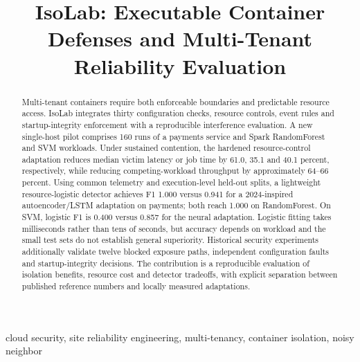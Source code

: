 \documentclass[conference,letterpaper]{IEEEtran}
\begin{document}
\title{IsoLab: Executable Container Defenses and Multi-Tenant Reliability Evaluation}
\author{
\and
{}
}
\maketitle

\begin{abstract}
Multi-tenant containers require both enforceable boundaries and predictable resource access. IsoLab integrates thirty configuration checks, resource controls, event rules and startup-integrity enforcement with a reproducible interference evaluation. A new single-host pilot comprises 160 runs of a payments service and Spark RandomForest and SVM workloads. Under sustained contention, the hardened resource-control adaptation reduces median victim latency or job time by 61.0, 35.1 and 40.1 percent, respectively, while reducing competing-workload throughput by approximately 64--66 percent. Using common telemetry and execution-level held-out splits, a lightweight resource-logistic detector achieves F1 1.000 versus 0.941 for a 2024-inspired autoencoder/LSTM adaptation on payments; both reach 1.000 on RandomForest. On SVM, logistic F1 is 0.400 versus 0.857 for the neural adaptation. Logistic fitting takes milliseconds rather than tens of seconds, but accuracy depends on workload and the small test sets do not establish general superiority. Historical security experiments additionally validate twelve blocked exposure paths, independent configuration faults and startup-integrity decisions. The contribution is a reproducible evaluation of isolation benefits, resource cost and detector tradeoffs, with explicit separation between published reference numbers and locally measured adaptations.
\end{abstract}

\begin{IEEEkeywords}
cloud security, site reliability engineering, multi-tenancy, container isolation, noisy neighbor
\end{IEEEkeywords}
\end{document}
